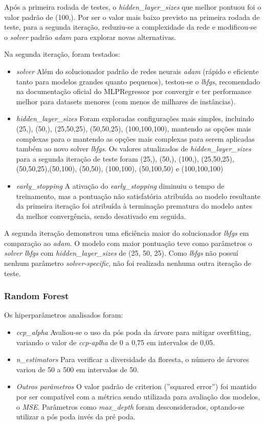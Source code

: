 \documentclass{report}
\begin{document}
Após a primeira rodada de testes, o \textit{hidden\_layer\_sizes} que melhor pontuou foi o valor padrão de (100,). Por ser o valor mais baixo previsto na primeira rodada de teste, para a segunda iteração, reduziu-se a complexidade da rede e modificou-se o \textit{solver} padrão \textit{adam} para explorar novas alternativas.

Na segunda iteração, foram testados:

\begin{itemize}
    \item \textit{solver}
    Além do solucionador padrão de redes neurais \textit{adam} (rápido e eficiente tanto para modelos grandes quanto pequenos), testou-se o \textit{lbfgs}, recomendado na documentação oficial do MLPRegressor por convergir e ter performance melhor para datasets menores (com menos de milhares de instâncias).
    \item \textit{hidden\_layer\_sizes}
    Foram exploradas configurações mais simples, incluindo (25,), (50,), (25,50,25),
    (50,50,25), (100,100,100), mantendo as opções mais complexas para o  mantendo as opções mais complexas para serem aplicadas também ao novo solver \textit{lbfgs}. Os valores atualizados de \textit{hidden\_layer\_sizes} para a segunda iteração de teste foram (25,), (50,), (100,), (25,50,25),(50,50,25),(50,100), (50,50), (100,100), (50,100,50) e (100,100,100)
    \item \textit{early\_stopping}
    A ativação do \textit{early\_stopping} diminuiu o tempo de treinamento, mas a pontuação não satisfatória atribuída ao modelo resultante da primeira iteração foi atribuída à terminação prematura do modelo antes da melhor convergência, sendo desativado em seguida.
\end{itemize}

A segunda iteração demonstrou uma eficiência maior do solucionador \textit{lbfgs} em comparação ao \textit{adam}. O modelo com maior pontuação teve como parâmetros o \textit{solver lbfgs} com \textit{hidden\_layer\_sizes} de (25, 50, 25). Como \textit{lbfgs} não possuí nenhum parâmetro \textit{solver-specific}, não foi realizada nenhuma outra iteração de teste.

\subsubsection{Random Forest}
Os hiperparâmetros analisados foram:
\begin{itemize}
    \item \textit{ccp\_alpha}
    Avaliou-se o uso da pós poda da árvore para mitigar overfitting, variando o valor de \textit{ccp-aplha} de 0 a 0,75 em intervalos de 0,05. 
    \item \textit{n\_estimators}
    Para verificar a diversidade da floresta, o número de árvores variou de 50 a 500 em intervalos de 50.
    \item \textit{Outros parâmetros}
    O valor padrão de criterion (”squared error”) foi mantido por ser compatível com a métrica sendo utilizada para avaliação dos modelos, o \textit{MSE}. Parâmetros como \textit{max\_depth} foram desconsiderados, optando-se utilizar a pós poda invés da pré poda.
\end{itemize}
\end{document}
